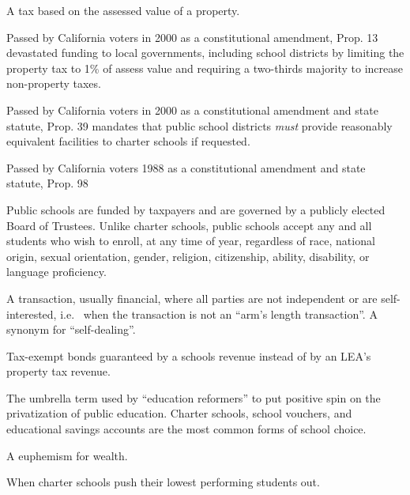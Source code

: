 \begin{description}[nosep]
\medskip\item[property tax] A tax based on the assessed value of a property.

\medskip\item[Proposition 13] Passed by California voters in 2000 as a constitutional amendment, Prop. 13 devastated funding to local governments, including school districts by limiting the property tax to 1\% of assess value and requiring a two-thirds majority to increase non-property taxes.

\medskip\item[Proposition 39] Passed by California voters in 2000 as a constitutional amendment and state statute, Prop. 39 mandates that public school districts \emph{must} provide reasonably equivalent facilities to charter schools if requested.

\medskip\item[Proposition 98] Passed by California voters 1988 as a constitutional amendment and state statute, Prop. 98 

\medskip\item[public school] Public schools are funded by taxpayers and are governed by a publicly elected Board of Trustees. Unlike charter schools, public schools accept any and all students who wish to enroll, at any time of year, regardless of race, national origin, sexual orientation, gender, religion, citizenship, ability, disability, or language proficiency. 

\medskip\item[related party transaction]  A transaction, usually financial, where all parties are not independent or are self-interested, i.e.  when the transaction is not an ``arm's length transaction''. A synonym for ``self-dealing''.

\medskip\item[revenue bonds] Tax-exempt bonds guaranteed by a schools revenue instead of by an LEA's property tax revenue.

\medskip\item[school choice] The umbrella term used by ``education reformers'' to put positive spin on the privatization of public education. Charter schools, school vouchers, and educational savings accounts are the most common forms of school choice.

\medskip\item[socio-economic status] A euphemism for wealth.

\medskip\item[student pushout] When charter schools push their lowest performing students out.


\end{description}
